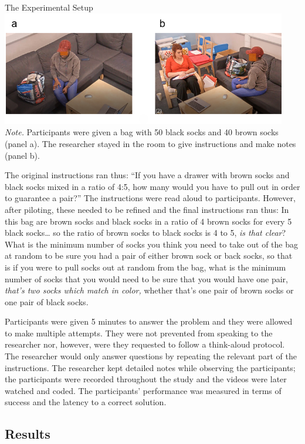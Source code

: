 \documentclass[twocolumn, serif, empirical, authordate]{jote-article}
\begin{document}
{{The Experimental Setup \includegraphics[width=4.92014in,height=1.96042in]{media/media/image1.png} 
\emph{Note.} Participants were given a bag with 50 black socks and 40 brown socks (panel a). The researcher stayed in the room to give instructions and make notes (panel b).

The original instructions ran thus: ``If you have a drawer with brown socks and black socks mixed in a ratio of 4:5, how many would you have to pull out in order to guarantee a pair?'' The instructions were read aloud to participants. However, after piloting, these needed to be refined and the final instructions ran thus: In this bag are brown socks and black socks in a ratio of 4 brown socks for every 5 black socks\ldots{} so the ratio of brown socks to black socks is 4 to 5, \emph{is that clear}? What is the minimum number of socks you think you need to take out of the bag at random to be sure you had a pair of either brown sock or back socks, so that is if you were to pull socks out at random from the bag, what is the minimum number of socks that you would need to be sure that you would have one pair, \emph{that's two socks which match in color,} whether that's one pair of brown socks or one pair of black socks.

Participants were given 5 minutes to answer the problem and they were allowed to make multiple attempts. They were not prevented from speaking to the researcher nor, however, were they requested to follow a think-aloud protocol. The researcher would only answer questions by repeating the relevant part of the instructions. The researcher kept detailed notes while observing the participants; the participants were recorded throughout the study and the videos were later watched and coded. The participants' performance was measured in terms of success and the latency to a correct solution.


\subsection{Results}

}}
\end{document}
